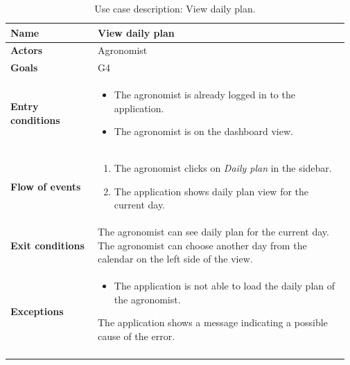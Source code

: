 \begin{longtable}{@{}p{0.25\linewidth} p{0.72\linewidth}@{}}
    \toprule
	\textbf{Name}               & View daily plan\\
	\midrule
	\textbf{Actors}             & Agronomist\\
	\midrule
	\textbf{Goals}              & G4 \\
	\midrule
	
	\textbf{Entry conditions}   & \begin{itemize}[leftmargin=.4cm,noitemsep,topsep=0pt,before=\vspace{-3mm},after=\vspace{-4mm}]
	    \item The agronomist is already logged in to the application.
	    \item The agronomist is on the dashboard view.
	\end{itemize}\\
	\midrule
	
	\textbf{Flow of events}     & \begin{enumerate}[leftmargin=.4cm,noitemsep,topsep=0pt,before=\vspace{-3mm},after=\vspace{-4mm}]
	    \item The agronomist clicks on \textit{Daily plan} in the sidebar.
	    \item The application shows daily plan view for the current day.
	\end{enumerate}\\
	\midrule
	\textbf{Exit conditions}    & The agronomist can see daily plan for the current day. The agronomist can choose another day from the calendar on the left side of the view. \\
	\midrule
	
	\textbf{Exceptions}         & 
    \begin{itemize}[leftmargin=.4cm,noitemsep,topsep=0pt,before=\vspace{-3mm}]
	   \item The application is not able to load the daily plan of the agronomist.
	\end{itemize}
	The application shows a message indicating a possible cause of the error.
	\\\bottomrule
	\caption{Use case description: View daily plan.} 
\end{longtable}

